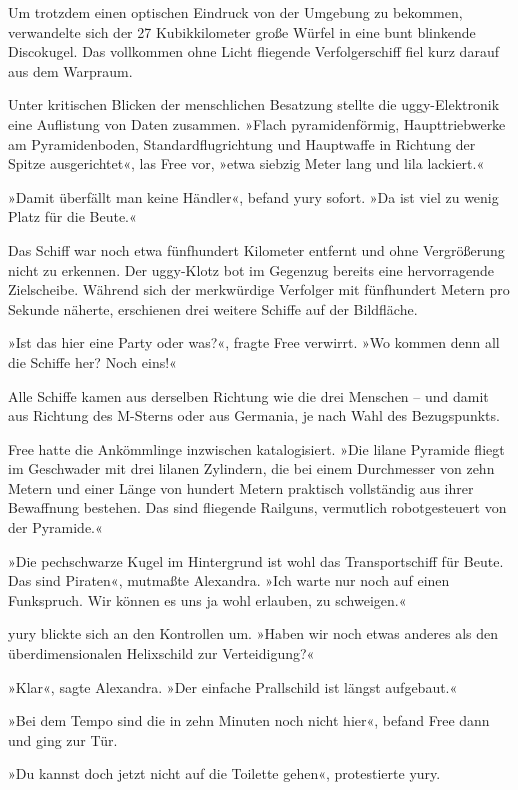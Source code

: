 Um trotzdem einen optischen Eindruck von der Umgebung zu bekommen, verwandelte sich der 27 Kubikkilometer große Würfel in eine bunt blinkende Discokugel. Das vollkommen ohne Licht fliegende Verfolgerschiff fiel kurz darauf aus dem Warpraum.

Unter kritischen Blicken der menschlichen Besatzung stellte die uggy-Elektronik eine Auflistung von Daten zusammen. »Flach pyramidenförmig, Haupttriebwerke am Pyramidenboden, Standardflugrichtung und Hauptwaffe in Richtung der Spitze ausgerichtet«, las Free vor, »etwa siebzig Meter lang und lila lackiert.«

»Damit überfällt man keine Händler«, befand yury sofort. »Da ist viel zu wenig Platz für die Beute.«

Das Schiff war noch etwa fünfhundert Kilometer entfernt und ohne Vergrößerung nicht zu erkennen. Der uggy-Klotz bot im Gegenzug bereits eine hervorragende Zielscheibe. Während sich der merkwürdige Verfolger mit fünfhundert Metern pro Sekunde näherte, erschienen drei weitere Schiffe auf der Bildfläche.

»Ist das hier eine Party oder was?«, fragte Free verwirrt. »Wo kommen denn all die Schiffe her? Noch eins!«

Alle Schiffe kamen aus derselben Richtung wie die drei Menschen – und damit aus Richtung des M-Sterns oder aus Germania, je nach Wahl des Bezugspunkts.

Free hatte die Ankömmlinge inzwischen katalogisiert. »Die lilane Pyramide fliegt im Geschwader mit drei lilanen Zylindern, die bei einem Durchmesser von zehn Metern und einer Länge von hundert Metern praktisch vollständig aus ihrer Bewaffnung bestehen. Das sind fliegende Railguns, vermutlich robotgesteuert von der Pyramide.«

»Die pechschwarze Kugel im Hintergrund ist wohl das Transportschiff für Beute. Das sind Piraten«, mutmaßte Alexandra. »Ich warte nur noch auf einen Funkspruch. Wir können es uns ja wohl erlauben, zu schweigen.«

yury blickte sich an den Kontrollen um. »Haben wir noch etwas anderes als den überdimensionalen Helixschild zur Verteidigung?«

»Klar«, sagte Alexandra. »Der einfache Prallschild ist längst aufgebaut.«

»Bei dem Tempo sind die in zehn Minuten noch nicht hier«, befand Free dann und ging zur Tür.

»Du kannst doch jetzt nicht auf die Toilette gehen«, protestierte yury.

